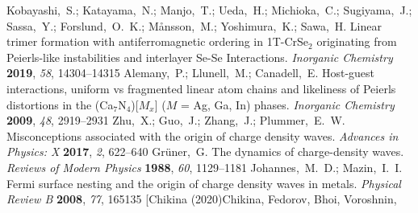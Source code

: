 \documentclass[journal=cmatex,manuscript=article]{achemso}
\begin{document}
\begin{mcitethebibliography}{73}
	{\mcitedefaultendpunct}{\mcitedefaultseppunct}\relax
	\EndOfBibitem
	Kobayashi,~S.; Katayama,~N.; Manjo,~T.; Ueda,~H.; Michioka,~C.; Sugiyama,~J.;
	Sassa,~Y.; Forslund,~O.~K.; M{\aa}nsson,~M.; Yoshimura,~K.; Sawa,~H. Linear
	trimer formation with antiferromagnetic ordering in {1T}-{CrSe}$_2$
	originating from {P}eierls-like instabilities and interlayer {Se}-{Se}
	Interactions. \emph{Inorganic Chemistry} \textbf{2019}, \emph{58},
	14304--14315\relax
	\mciteBstWouldAddEndPuncttrue
	\mciteSetBstMidEndSepPunct{\mcitedefaultmidpunct}
	{\mcitedefaultendpunct}{\mcitedefaultseppunct}\relax
	\EndOfBibitem
	Alemany,~P.; Llunell,~M.; Canadell,~E. Host-guest interactions, uniform vs
	fragmented linear atom chains and likeliness of {P}eierls distortions in the
	({Ca}$_7${N}$_4$)[${M}$$_x$] (${M}$ = {Ag}, {Ga}, {In}) phases.
	\emph{Inorganic Chemistry} \textbf{2009}, \emph{48}, 2919--2931\relax
	\mciteBstWouldAddEndPuncttrue
	\mciteSetBstMidEndSepPunct{\mcitedefaultmidpunct}
	{\mcitedefaultendpunct}{\mcitedefaultseppunct}\relax
	\EndOfBibitem
	Zhu,~X.; Guo,~J.; Zhang,~J.; Plummer,~E.~W. Misconceptions associated with the
	origin of charge density waves. \emph{Advances in Physics: X} \textbf{2017},
	\emph{2}, 622--640\relax
	\mciteBstWouldAddEndPuncttrue
	\mciteSetBstMidEndSepPunct{\mcitedefaultmidpunct}
	{\mcitedefaultendpunct}{\mcitedefaultseppunct}\relax
	\EndOfBibitem
	Gr\"uner,~G. The dynamics of charge-density waves. \emph{Reviews of Modern
		Physics} \textbf{1988}, \emph{60}, 1129--1181\relax
	\mciteBstWouldAddEndPuncttrue
	\mciteSetBstMidEndSepPunct{\mcitedefaultmidpunct}
	{\mcitedefaultendpunct}{\mcitedefaultseppunct}\relax
	\EndOfBibitem
	Johannes,~M.~D.; Mazin,~I.~I. Fermi surface nesting and the origin of charge
	density waves in metals. \emph{Physical Review B} \textbf{2008}, \emph{77},
	165135\relax
	\mciteBstWouldAddEndPuncttrue
	\mciteSetBstMidEndSepPunct{\mcitedefaultmidpunct}
	{\mcitedefaultendpunct}{\mcitedefaultseppunct}\relax
	\EndOfBibitem
	\bibitem[Chikina (2020)Chikina, Fedorov, Bhoi, Voroshnin,
$$
\end{mcitethebibliography}
\end{document}
